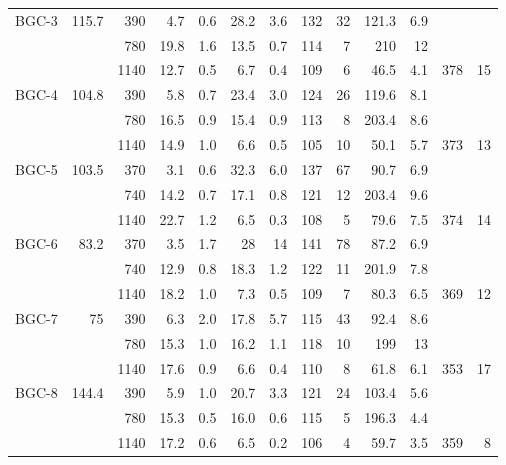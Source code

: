 \documentclass[authoryear,review,12pt]{elsarticle}
\begin{document}
\begin{table}
\begin{tabular}{|r|rrrrrrrrrrrr|}
    BGC-3 & 115.7 & 390   & 4.7   & 0.6   & 28.2  & 3.6   & 132   & 32    & 121.3 & 6.9   &       &  \\
          &       & 780   & 19.8  & 1.6   & 13.5  & 0.7   & 114   & 7     & 210   & 12    &       &  \\
          &       & 1140  & 12.7  & 0.5   & 6.7   & 0.4   & 109   & 6     & 46.5  & 4.1   & 378   & 15 \\
    BGC-4 & 104.8 & 390   & 5.8   & 0.7   & 23.4  & 3.0   & 124   & 26    & 119.6 & 8.1   &       &  \\
          &       & 780   & 16.5  & 0.9   & 15.4  & 0.9   & 113   & 8     & 203.4 & 8.6   &       &  \\
          &       & 1140  & 14.9  & 1.0   & 6.6   & 0.5   & 105   & 10    & 50.1  & 5.7   & 373   & 13 \\
    BGC-5 & 103.5 & 370   & 3.1   & 0.6   & 32.3  & 6.0   & 137   & 67    & 90.7  & 6.9   &       &  \\
          &       & 740   & 14.2  & 0.7   & 17.1  & 0.8   & 121   & 12    & 203.4 & 9.6   &       &  \\
          &       & 1140  & 22.7  & 1.2   & 6.5   & 0.3   & 108   & 5     & 79.6  & 7.5   & 374   & 14 \\
    BGC-6 & 83.2  & 370   & 3.5   & 1.7   & 28    & 14    & 141   & 78    & 87.2  & 6.9   &       &  \\
          &       & 740   & 12.9  & 0.8   & 18.3  & 1.2   & 122   & 11    & 201.9 & 7.8   &       &  \\
          &       & 1140  & 18.2  & 1.0   & 7.3   & 0.5   & 109   & 7     & 80.3  & 6.5   & 369   & 12 \\
    BGC-7 & 75    & 390   & 6.3   & 2.0   & 17.8  & 5.7   & 115   & 43    & 92.4  & 8.6   &       &  \\
          &       & 780   & 15.3  & 1.0   & 16.2  & 1.1   & 118   & 10    & 199   & 13    &       &  \\
          &       & 1140  & 17.6  & 0.9   & 6.6   & 0.4   & 110   & 8     & 61.8  & 6.1   & 353   & 17 \\
    BGC-8 & 144.4 & 390   & 5.9   & 1.0   & 20.7  & 3.3   & 121   & 24    & 103.4 & 5.6   &       &  \\
          &       & 780   & 15.3  & 0.5   & 16.0  & 0.6   & 115   & 5     & 196.3 & 4.4   &       &  \\
          &       & 1140  & 17.2  & 0.6   & 6.5   & 0.2   & 106   & 4     & 59.7  & 3.5   & 359   & 8 \\

\end{tabular}
\end{table}
\end{document}
